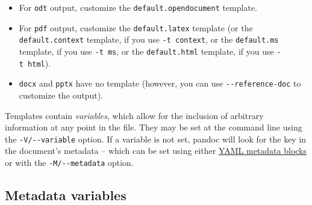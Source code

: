 \begin{itemize}
\tightlist
\item
  For \texttt{odt} output, customize the \texttt{default.opendocument}
  template.
\item
  For \texttt{pdf} output, customize the \texttt{default.latex} template
  (or the \texttt{default.context} template, if you use
  \texttt{-t\ context}, or the \texttt{default.ms} template, if you use
  \texttt{-t\ ms}, or the \texttt{default.html} template, if you use
  \texttt{-t\ html}).
\item
  \texttt{docx} and \texttt{pptx} have no template (however, you can use
  \texttt{-\/-reference-doc} to customize the output).
\end{itemize}

Templates contain \emph{variables}, which allow for the inclusion of
arbitrary information at any point in the file. They may be set at the
command line using the \texttt{-V/-\/-variable} option. If a variable is
not set, pandoc will look for the key in the document's metadata --
which can be set using either
\protect\hyperlink{extension-yaml_metadata_block}{YAML metadata blocks}
or with the \texttt{-M/-\/-metadata} option.

\hypertarget{metadata-variables}{%
\subsection{Metadata variables}\label{metadata-variables}}

